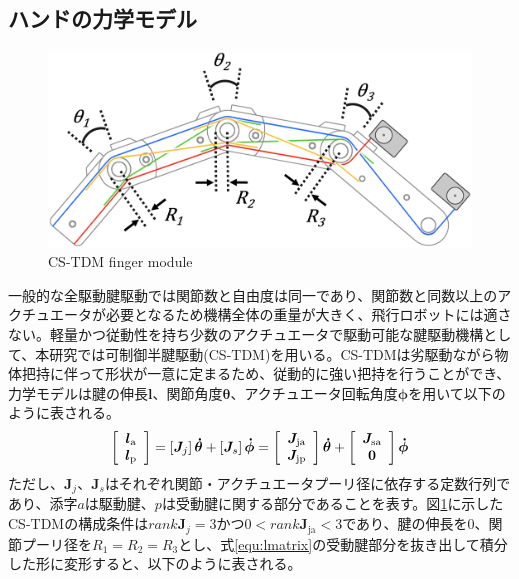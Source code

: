 \documentclass{jarticle}
\begin{document}
\subsection{ハンドの力学モデル}
\vspace{-4mm}
\begin{figure}[h]
  \centering
  \includegraphics[width=0.8\columnwidth]{figs/cs-tdm.eps}
  \caption{CS-TDM finger module}
  \label{fig:cs-tdm}
  \vspace{-2mm}
\end{figure}
一般的な全駆動腱駆動では関節数と自由度は同一であり、関節数と同数以上のアクチュエータが必要となるため機構全体の重量が大きく、飛行ロボットには適さない。軽量かつ従動性を持ち少数のアクチュエータで駆動可能な腱駆動機構として、本研究では可制御半腱駆動(CS-TDM)を用いる。CS-TDMは劣駆動ながら物体把持に伴って形状が一意に定まるため、従動的に強い把持を行うことができ、力学モデルは腱の伸長$\bm{l}$、関節角度$\bm{\theta}$、アクチュエータ回転角度$\bm{\phi}$を用いて以下のように表される。
\vspace{-2mm}
\begin{equation}
  \left[ \begin{array}{c} \bm{l}_\text{a}\\ \bm{l}_\text{p} \end{array} \right] = \left[ \bm{J}_j \right] \bm{\dot{\theta}} + \left[ \bm{J}_s \right] \bm{\dot{\phi}} = \left[ \begin{array}{c} \bm{J}_\text{ja}\\ \bm{J}_\text{jp} \end{array} \right]  \bm{\dot{\theta}} + \left[ \begin{array}{c} \bm{J}_\text{sa}\\ \bm{0} \end{array} \right] \bm{\dot{\phi}}
  \vspace{-2mm}
  \label{equ:lmatrix}
\end{equation}
ただし、$\bm{J}_j、\bm{J}_s$はそれぞれ関節・アクチュエータプーリ径に依存する定数行列であり、添字$a$は駆動腱、$p$は受動腱に関する部分であることを表す。図\ref{fig:cs-tdm}に示したCS-TDMの構成条件は$rank\bm{J}_j = 3$かつ$0 < rank\bm{J}_\text{ja} < 3$であり、腱の伸長を0、関節プーリ径を$R_1 = R_2 = R_3$とし、式\ref{equ:lmatrix}の受動腱部分を抜き出して積分した形に変形すると、以下のように表される。
\end{document}
